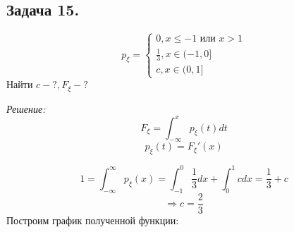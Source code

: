 \subsection*{Задача 15.}

\[
p_{\xi} =
\begin{cases}
	0, x \le -1 \text{ или } x > 1 \\
	\frac{1}{3}, x \in (-1,0] \\
	c, x \in (0,1]
\end{cases}
\]
Найти $c - ?, F_{\xi} - ?$

\noindent \textit{Решение:}
\[ F_{\xi} = \int_{-\infty}^{x} p_{\xi} (t) dt \]
\[ p_{\xi}(t) = F_{\xi}'(x) \]

\[ 1 = \int_{-\infty}^{\infty} p_{\xi} (x) = \int_{-1}^{0} \frac{1}{3}dx + \int_{0}^{1} c dx = \frac{1}{3} + c \]
\[ \Rightarrow c = \frac{2}{3} \]
Построим график полученной функции:
\begin{figure}[H]
\end{figure}

